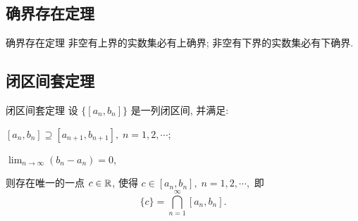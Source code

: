 \subsection{确界存在定理}
\begin{theorem}{确界存在定理}
	非空有上界的实数集必有上确界; 非空有下界的实数集必有下确界.
\end{theorem}
\subsection{闭区间套定理}
\begin{theorem}{闭区间套定理}
	设 $\{[a_n,b_n]\}$ 是一列闭区间, 并满足:
	\begin{proenumerate}
		\item $[a_n,b_n] \supseteq [a_{n+1},b_{n+1}],\; n=1,2,\cdots$;
		\item $\displaystyle\lim_{n\to\infty}(b_n-a_n)=0$,
	\end{proenumerate}
	则存在唯一的一点 $c\in\mathbb{R}$, 使得 $c\in[a_n,b_n],\; n=1,2,\cdots,$ 即
	\[\{c\}= \bigcap_{n=1}^{\infty}[a_n,b_n].\]
\end{theorem}
\backmatter
\appendix
\printindex

